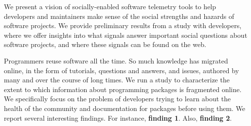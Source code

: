 We present a vision of socially-enabled software telemetry tools to help developers and maintainers make sense of the social strengths and hazards of software projects.
We provide preliminary results from a study with developers, where we offer insights into what signals answer important social questions about software projects, and where these signals can be found on the web.

Programmers reuse software all the time.
So much knowledge has migrated online, in the form of tutorials, questions and answers, and issues, authored by many and over the course of long times.
We run a study to characterize the extent to which information about programming packages is fragmented online.
We specifically focus on the problem of developers trying to learn about the health of the community and documentation for packages before using them.
We report several interesting findings.
For instance, \textbf{finding 1}.
Also, \textbf{finding 2}.
\fi
